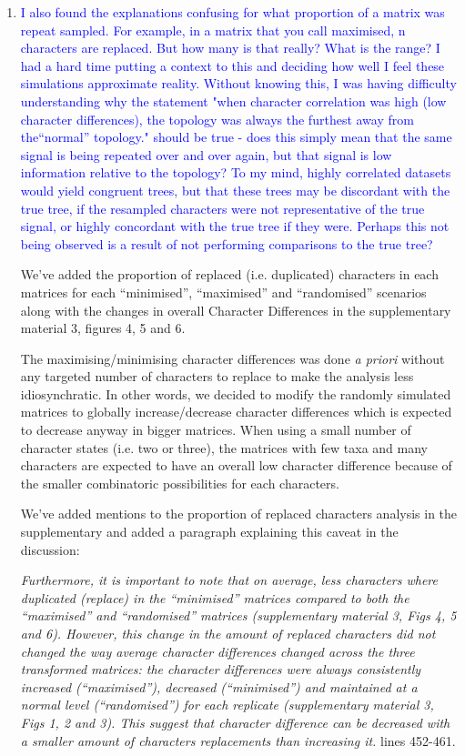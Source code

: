 \documentclass[12pt,letterpaper]{article}
\begin{document}
\begin{enumerate}
\item{\textcolor{blue}{I also found the explanations confusing for what proportion of a matrix was repeat sampled. For example, in a matrix that you call maximised, n characters are replaced. But how many is that really? What is the range? I had a hard time putting a context to this and deciding how well I feel these simulations approximate reality. Without knowing this, I was having difficulty understanding why the statement "when character correlation was high (low character differences), the topology was always the furthest away from the``normal'' topology." 
should be true - does this simply mean that the same signal is being repeated over and over again, but that signal is low information relative to the topology? To my mind, highly correlated datasets would yield congruent trees, but that these trees may be discordant with the true tree, if the resampled characters were not representative of the true signal, or highly concordant with the true tree if they were. Perhaps this not being observed is a result of not performing comparisons to the true tree?}}

We've added the proportion of replaced (i.e. duplicated) characters in each matrices for each ``minimised'', ``maximised'' and ``randomised'' scenarios along with the changes in overall Character Differences in the supplementary material 3, figures 4, 5 and 6.

The maximising/minimising character differences was done \textit{a priori} without any targeted number of characters to replace to make the analysis less idiosynchratic.
In other words, we decided to modify the randomly simulated matrices to globally increase/decrease character differences which is expected to decrease anyway in bigger matrices.
When using a small number of character states (i.e. two or three), the matrices with few taxa and many characters are expected to have an overall low character difference because of the smaller combinatoric possibilities for each characters.

We've added mentions to the proportion of replaced characters analysis in the supplementary and added a paragraph explaining this caveat in the discussion:

\textit{Furthermore, it is important to note that on average, less characters where duplicated (replace) in the ``minimised'' matrices compared to both the ``maximised'' and ``randomised'' matrices (supplementary material 3, Figs 4, 5 and 6).
However, this change in the amount of replaced characters did not changed the way average character differences changed across the three transformed matrices: the character differences were always consistently increased (``maximised''), decreased (``minimised'') and maintained at a normal level (``randomised'') for each replicate (supplementary material 3, Figs 1, 2 and 3).
This suggest that character difference can be decreased with a smaller amount of characters replacements than increasing it.} lines 452-461.


\end{enumerate}
\end{document}
